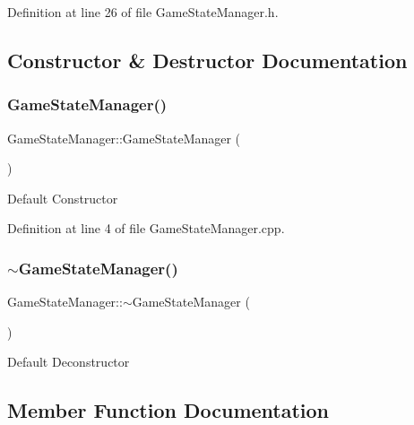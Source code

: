 Definition at line 26 of file Game\+State\+Manager.\+h.



\subsection{Constructor \& Destructor Documentation}
\mbox{\label{class_game_state_manager_aa9769dca27ad070cf5491a7f54c7d85e}} 
\subsubsection{\texorpdfstring{GameStateManager()}{GameStateManager()}}
{\footnotesize\ttfamily Game\+State\+Manager\+::\+Game\+State\+Manager (\begin{DoxyParamCaption}{ }\end{DoxyParamCaption})}

Default Constructor 

Definition at line 4 of file Game\+State\+Manager.\+cpp.

\mbox{\label{class_game_state_manager_ac4bbd99de7c51df4377bf25d367cc527}} 
\subsubsection{\texorpdfstring{$\sim$GameStateManager()}{~GameStateManager()}}
{\footnotesize\ttfamily Game\+State\+Manager\+::$\sim$\+Game\+State\+Manager (\begin{DoxyParamCaption}{ }\end{DoxyParamCaption})\hspace{0.3cm}{\ttfamily [default]}}

Default Deconstructor 

\subsection{Member Function Documentation}
\mbox{\label{class_game_state_manager_af891544d0671ad46cb561f350ed3d175}} 
